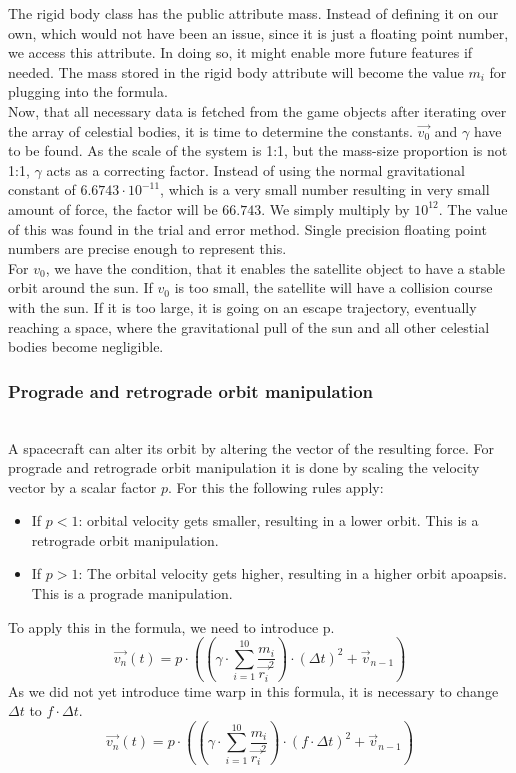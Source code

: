 \documentclass[conference,compsoc]{IEEEtran}
\begin{document}
The rigid body class has the public attribute mass. Instead of defining it on our own, which would not have been an issue, since it is just a floating point number, we access this attribute. In doing so, it might enable more future features if needed. The mass stored in the rigid body attribute will become the value $m_{i}$ for plugging into the formula. \\
Now, that all necessary data is fetched from the game objects after iterating over the array of celestial bodies, it is time to determine the constants. $\vec{v_{0}}$ and $\gamma$ have to be found. As the scale of the system is 1:1, but the mass-size proportion is not 1:1, $\gamma$ acts as a correcting factor. Instead of using the normal gravitational constant of $6.6743 \cdot 10^{-11}$, which is a very small number resulting in very small amount of force, the factor will be $66.743$. We simply multiply by $10^12$. The value of this was found in the trial and error method. Single precision floating point numbers are precise enough to represent this. \\
For $v_{0}$, we have the condition, that it enables the satellite object to have a stable orbit around the sun. If $v_{0}$ is too small, the satellite will have a collision course with the sun. If it is too large, it is going on an escape trajectory, eventually reaching a space, where the gravitational pull of the sun and all other celestial bodies become negligible.
\subsubsection{Prograde and retrograde orbit manipulation} \hfill\\
A spacecraft can alter its orbit by altering the vector of the resulting force. For prograde and retrograde orbit manipulation it is done by scaling the velocity vector by a scalar factor $p$. For this the following rules apply:
\begin{itemize}
	\item If $p < 1$: orbital velocity gets smaller, resulting in a lower orbit. This is a retrograde orbit manipulation.
	\item If $p > 1$: The orbital velocity gets higher, resulting in a higher orbit apoapsis. This is a prograde manipulation.
\end{itemize}
To apply this in the formula, we need to introduce p.
$$ \vec{v_{n}}(t) = p\cdot ((\gamma \cdot \sum_{i=1}^{10}{\frac{m_{i}}{\vec{r_{i}}^{2}}}) \cdot (\Delta t)^{2} + \vec{v}_{n-1}) $$
As we did not yet introduce time warp in this formula, it is necessary to change $\Delta t$ to $f\cdot \Delta t$.
$$ \vec{v_{n}}(t) = p\cdot((\gamma \cdot \sum_{i=1}^{10}{\frac{m_{i}}{\vec{r_{i}}^{2}}}) \cdot (f\cdot\Delta t)^{2} + \vec{v}_{n-1}) $$
\end{document}
